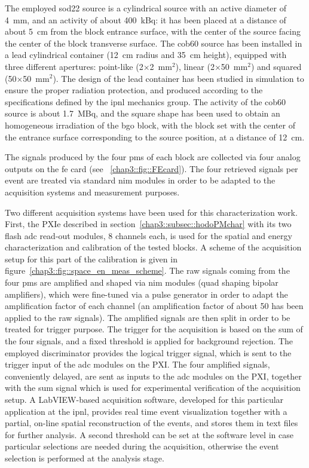 The employed \gls{sod22} source is a cylindrical source with an active diameter of 4~mm, and an activity of about 400~kBq: it has been placed at a distance of about 5~cm from the block entrance surface, with the center of the source facing the center of the block transverse surface. The \gls{cob60} source has been installed in a lead cylindrical container (12~cm radius and 35~cm height), equipped with three different apertures: point-like (2$\times$2~mm$^2$), linear (2$\times$50~mm$^2$) and squared (50$\times$50~mm$^2$). The design of the lead container has been studied in simulation to ensure the proper radiation protection, and produced according to the specifications defined by the \gls{ipnl} mechanics group. The activity of the \gls{cob60} source is about 1.7~MBq, and the square shape has been used to obtain an homogeneous irradiation of the \gls{bgo} block, with the block set with the center of the entrance surface corresponding to the source position, at a distance of 12~cm.

The signals produced by the four \glspl{pm} of each block are collected via four analog outputs on the \gls{fe} card (see \figurename~\ref{chap3::fig::FEcard}). The four retrieved signals per event are treated via standard \gls{nim} modules in order to be adapted to the acquisition systems and measurement purposes.

Two different acquisition systems have been used for this characterization work. First, the PXIe described in section~\ref{chap3::subsec::hodoPMchar} with its two flash \gls{adc} read-out modules, 8 channels each, is used for the spatial and energy characterization and calibration of the tested blocks. A scheme of the acquisition setup for this part of the calibration is given in figure~\ref{chap3::fig::space_en_meas_scheme}. The raw signals coming from the four \glspl{pm} are amplified and shaped via \gls{nim} modules (quad shaping bipolar amplifiers), which were fine-tuned via a pulse generator in order to adapt the amplification factor of each channel (an amplification factor of about 50 has been applied to the raw signals). The amplified signals are then split in order to be treated for trigger purpose. The trigger for the acquisition is based on the sum of the four signals, and a fixed threshold is applied for background rejection. The employed discriminator provides the logical trigger signal, which is sent to the trigger input of the \gls{adc} modules on the PXI. The four amplified signals, conveniently delayed, are sent as inputs to the \gls{adc} modules on the PXI, together with the sum signal which is used for experimental verification of the acquisition setup. A LabVIEW-based acquisition software, developed for this particular application at the \gls{ipnl}, provides real time event visualization together with a partial, on-line spatial reconstruction of the events, and stores them in text files for further analysis. A second threshold can be set at the software level in case particular selections are needed during the acquisition, otherwise the event selection is performed at the analysis stage. 


